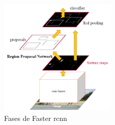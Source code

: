 \begin{figure}[H]
  \begin{center}
    \includegraphics[width=0.5\textwidth]{figures/estado_arte/faster_rcnn.png}
		\caption{Fases de Faster \acrshort{rcnn}}
		\label{fig.fast_rcnn}
		\end{center}
\end{figure}

